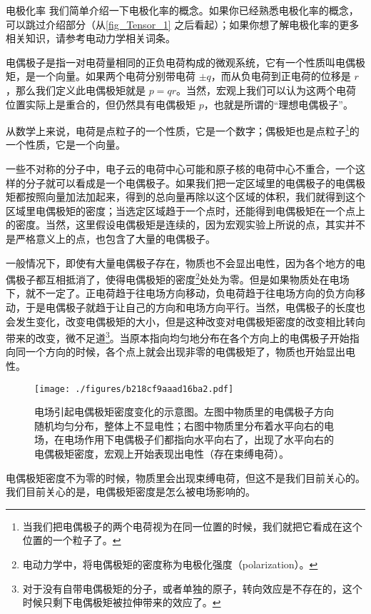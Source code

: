 \begin{example}{电极化率}
我们简单介绍一下电极化率的概念。如果你已经熟悉电极化率的概念，可以跳过介绍部分（从\autoref{fig_Tensor_1} 之后看起）；如果你想了解电极化率的更多相关知识，请参考电动力学相关词条。

电偶极子是指一对电荷量相同的正负电荷构成的微观系统，它有一个性质叫电偶极矩，是一个向量。如果两个电荷分别带电荷 $\pm q$，而从负电荷到正电荷的位移是 ${r}$，那么我们定义此电偶极矩就是 ${p}=q{r}$。当然，宏观上我们可以认为这两个电荷位置实际上是重合的，但仍然具有电偶极矩 ${p}$，也就是所谓的“理想电偶极子”。

从数学上来说，电荷是点粒子的一个性质，它是一个数字；偶极矩也是点粒子\footnote{当我们把电偶极子的两个电荷视为在同一位置的时候，我们就把它看成在这个位置的一个粒子了。}的一个性质，它是一个向量。

一些不对称的分子中，电子云的电荷中心可能和原子核的电荷中心不重合，一个这样的分子就可以看成是一个电偶极子。如果我们把一定区域里的电偶极子的电偶极矩都按照向量加法加起来，得到的总向量再除以这个区域的体积，我们就得到这个区域里电偶极矩的密度；当选定区域趋于一个点时，还能得到电偶极矩在一个点上的密度。当然，这里假设电偶极矩是连续的，因为宏观实验上所说的点，其实并不是严格意义上的点，也包含了大量的电偶极子。

一般情况下，即使有大量电偶极子存在，物质也不会显出电性，因为各个地方的电偶极子都互相抵消了，使得电偶极矩的密度\footnote{电动力学中，将电偶极矩的密度称为电极化强度（polarization）。}处处为零。但是如果物质处在电场下，就不一定了。正电荷趋于往电场方向移动，负电荷趋于往电场方向的负方向移动，于是电偶极子就趋于让自己的方向和电场方向平行。当然，电偶极子的长度也会发生变化，改变电偶极矩的大小，但是这种改变对电偶极矩密度的改变相比转向带来的改变，微不足道\footnote{对于没有自带电偶极矩的分子，或者单独的原子，转向效应是不存在的，这个时候只剩下电偶极矩被拉伸带来的效应了。}。当原本指向均匀地分布在各个方向上的电偶极子开始指向同一个方向的时候，各个点上就会出现非零的电偶极矩了，物质也开始显出电性。

\begin{figure}[ht]
\centering
\texttt{[image: ./figures/b218cf9aaad16ba2.pdf]}
\caption{电场引起电偶极矩密度变化的示意图。左图中物质里的电偶极子方向随机均匀分布，整体上不显电性；右图中物质里分布着水平向右的电场，在电场作用下电偶极子们都指向水平向右了，出现了水平向右的电偶极矩密度，宏观上开始表现出电性（存在束缚电荷）。} \label{fig_Tensor_1}
\end{figure}

电偶极矩密度不为零的时候，物质里会出现束缚电荷，但这不是我们目前关心的。我们目前关心的是，电偶极矩密度是怎么被电场影响的。


\end{example}
